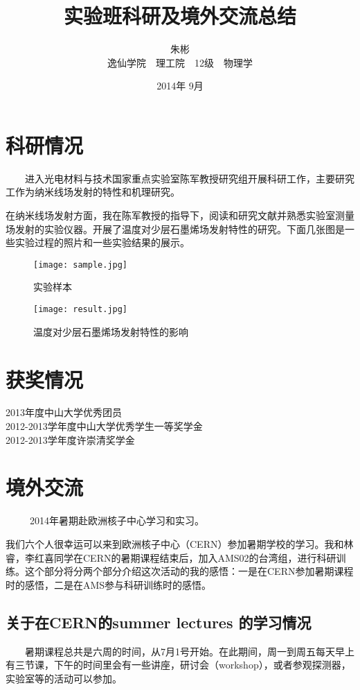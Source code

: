 \documentclass{article}
\title{实验班科研及境外交流总结}
\author{朱彬\\逸仙学院~~理工院~~12级~~物理学}
\date{2014年 9月}
\begin{document}
\begin{CJK*}{UTF8}{gbsn}
\maketitle
\section{科研情况}

\ \ \ \ 进入光电材料与技术国家重点实验室陈军教授研究组开展科研工作，主要研究工作为纳米线场发射的特性和机理研究。

在纳米线场发射方面，我在陈军教授的指导下，阅读和研究文献并熟悉实验室测量场发射的实验仪器。开展了温度对少层石墨烯场发射特性的研究。下面几张图是一些实验过程的照片和一些实验结果的展示。
\begin{figure}[h!]
\begin{minipage}[t]{0.5\linewidth}
\centering
\texttt{[image: sample.jpg]}
\caption{实验样本}
\label{fig:sample}
\end{minipage}%
\begin{minipage}[t]{0.5\linewidth}
\centering
\texttt{[image: result.jpg]}
\caption{温度对少层石墨烯场发射特性的影响}
\label{fig:result}
\end{minipage}%
\end{figure}

\section{获奖情况}
2013年度中山大学优秀团员\\
2012-2013学年度中山大学优秀学生一等奖学金\\
2012-2013学年度许崇清奖学金

\section{境外交流}
~~~~~2014年暑期赴欧洲核子中心学习和实习。

我们六个人很幸运可以来到欧洲核子中心（CERN）参加暑期学校的学习。我和林睿，李红喜同学在CERN的暑期课程结束后，加入AMS02的台湾组，进行科研训练。这个部分将分两个部分介绍这次活动的我的感悟：一是在CERN参加暑期课程时的感悟，二是在AMS参与科研训练时的感悟。
\subsection{关于在CERN的summer lectures 的学习情况}
~~~~暑期课程总共是六周的时间，从7月1号开始。在此期间，周一到周五每天早上有三节课，下午的时间里会有一些讲座，研讨会（workshop），或者参观探测器，实验室等的活动可以参加。

\end{CJK*}
\end{document}
